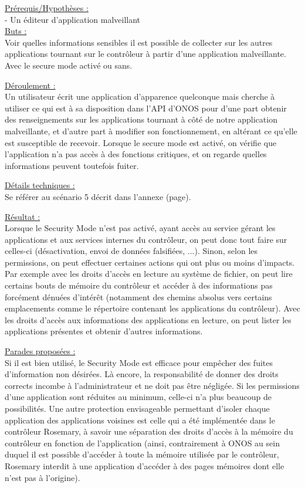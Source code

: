 \underline{Prérequis/Hypothèses :}\\
- Un éditeur d’application malveillant\\


\underline{Buts :}\\
Voir quelles informations sensibles il est possible de collecter sur les autres applications tournant sur le contrôleur à partir d’une application malveillante. Avec le secure mode activé ou sans.

\underline{Déroulement :}\\
Un utilisateur écrit une application d’apparence quelconque mais cherche à utiliser ce qui est à sa disposition dans l’API d’ONOS pour d’une part obtenir des renseignements sur les applications tournant à côté de notre application malveillante, et d’autre part à modifier son fonctionnement, en altérant ce qu’elle est susceptible de recevoir. Lorsque le secure mode est activé, on vérifie que l’application n’a pas accès à des fonctions critiques, et on regarde quelles informations peuvent toutefois fuiter.

\underline{Détails techniques :}\\
Se référer au scénario 5 décrit dans l'annexe (page).

\underline{Résultat :}\\
Lorsque le Security Mode n'est pas activé, ayant accès au service gérant les applications et aux services internes du contrôleur, on peut donc tout faire sur celles-ci (désactivation, envoi de données falsifiées, ...). Sinon, selon les permissions, on peut effectuer certaines actions qui ont plus ou moins d'impacts. Par exemple avec les droits d'accès en lecture au système de fichier, on peut lire certains bouts de mémoire du contrôleur et accéder à des informations pas forcément dénuées d'intérêt (notamment des chemins absolus vers certains emplacements comme le répertoire contenant les applications du contrôleur). Avec les droits d'accès aux informations des applications en lecture, on peut lister les applications présentes et obtenir d'autres informations.

\underline{Parades proposées :}\\
Si il est bien utilisé, le Security Mode est efficace pour empêcher des fuites d'information non désirées. Là encore, la responsabilité de donner des droits corrects incombe à l'administrateur et ne doit pas être négligée. Si les permissions d'une application sont réduites au minimum, celle-ci n'a plus beaucoup de possibilités. Une autre protection envisageable permettant d'isoler chaque application des applications voisines est celle qui a été implémentée dans le contrôleur Rosemary, à savoir une séparation des droits d'accès à la mémoire du contrôleur en fonction de l'application (ainsi, contrairement à ONOS au sein duquel il est possible d'accéder à toute la mémoire utilisée par le contrôleur, Rosemary interdit à une application d'accéder à des pages mémoires dont elle n'est pas à l'origine).

